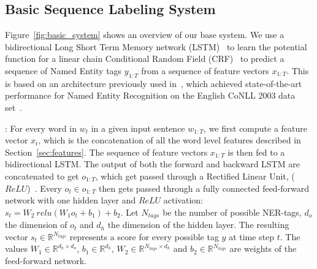 \documentclass[11pt,letterpaper]{article}
\begin{document}
\subsection{Basic Sequence Labeling System}
\label{sec:basic_system}

Figure~\ref{fig:basic_system} shows an overview of our base system. We use
a bidirectional Long Short Term Memory network (LSTM)~\cite{lstm}
to learn the potential function for a linear chain Conditional Random Field (CRF)~\cite{crf}
to predict a sequence of Named Entity tags $y_{1:T}$
from a sequence of feature vectors $x_{1:T}$. This is based on an architecture
previously used in~\cite{ner_lstm_cnn}, which achieved state-of-the-art performance
for Named Entity Recognition on the English CoNLL 2003 data set~\cite{conll}.

: For every word in $w_t$ in a given input
sentence $w_{1:T}$, we first compute a feature vector $x_t$, which is the
concatenation of all the word level features described in Section~\ref{sec:features}.
The sequence of feature vectors $x_{1:T}$ is then fed to a bidirectional LSTM\@.
The output of both the forward and backward LSTM are concatenated to get $o_{1:T}$,
which get passed through a Rectified Linear Unit, ($ReLU$)~\cite{relu}.
Every $o_{t} \in o_{1:T}$
then gets passed through a fully connected feed-forward network with one hidden
layer and $ReLU$ activation: $s_{t} = W_{2}\ relu(W_{1}o_{t} + b_{1}) + b_{2}$.
Let $N_{tags}$ be the number of possible NER-tags, $d_{o}$ the dimension of $o_{t}$
and $d_{h}$ the dimension of the hidden layer. The resulting vector
$s_{t} \in \mathbb{R}^{N_{tags}}$ represents a score for every possible tag $y$
at time step $t$. The values $W_{1} \in \mathbb{R}^{d_{h} \times d_{o}}$, $b_{1} \in \mathbb{R}^{d_h}$,
$W_{2} \in \mathbb{R}^{N_{tags} \times d_{h}}$ and $b_{2} \in \mathbb{R}^{N_{tags}}$
are weights of the feed-forward network.
\end{document}
